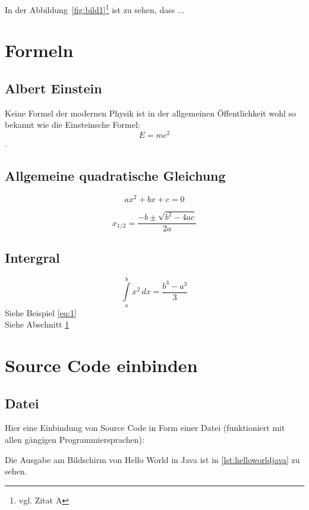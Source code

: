 In der Abbildung~\ref{fig:bild1}\footnote{vgl. Zitat A\cite{referenzA}} %
ist zu sehen, dass ...

\section{Formeln}
\label{sec:formeln}

\subsection{Albert Einstein}
Keine Formel der modernen Physik ist in der allgemeinen \"Offentlichkeit wohl so bekannt wie die Einsteinsche Formel:
\begin{equation*}
  E = mc^2
\end{equation*}.

\subsection{Allgemeine quadratische Gleichung}
\begin{equation*}
  ax^2 + bx + c = 0
\end{equation*}

\begin{equation*}
  x_{1/2} = \frac{-b \pm \sqrt{b^2-4ac}}{2a}
\end{equation*}

\subsection{Intergral}
\begin{equation}
  \label{eq:1}
  \int\limits_{a}^{b} x^{2} \, dx = \frac{ b^{3} - a^{3} }{3}
\end{equation}
Siehe Beispiel \eqref{eq:1} \\
Siehe Abschnitt \ref{sec:formeln}

\section{Source Code einbinden}
\subsection{Datei}
Hier eine Einbindung von Source Code in Form einer Datei (funktioniert mit allen g\"angigen Programmiersprachen):

Die Ausgabe am Bildschirm von Hello World in Java ist in \ref{lst:helloworldjava} zu sehen.
